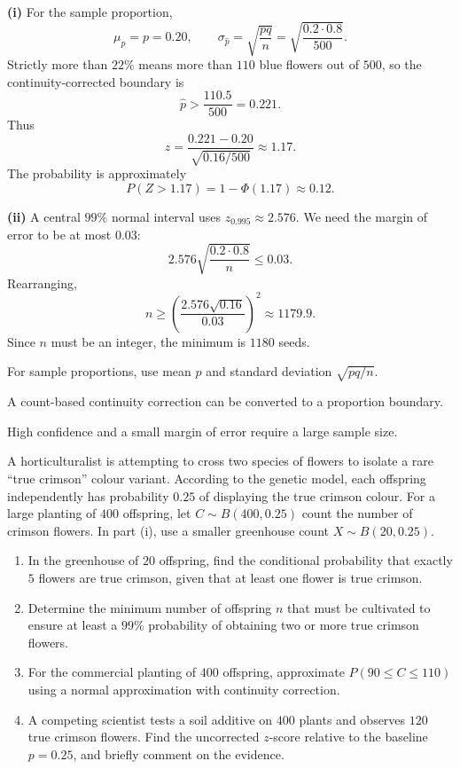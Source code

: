 \begin{solution}
\textbf{(i)} For the sample proportion,
\[
\mu_{\hat p}=p=0{.}20,\qquad
\sigma_{\hat p}=\sqrt{\frac{pq}{n}}=\sqrt{\frac{0{.}2\cdot0{.}8}{500}}.
\]
Strictly more than $22\%$ means more than $110$ blue flowers out of $500$, so the continuity-corrected boundary is
\[
\hat p>\frac{110{.}5}{500}=0{.}221.
\]
Thus
\[
z=\frac{0{.}221-0{.}20}{\sqrt{0{.}16/500}}\approx1{.}17.
\]
The probability is approximately
\[
P(Z>1{.}17)=1-\Phi(1{.}17)\approx \boxed{0{.}12}.
\]

\textbf{(ii)} A central $99\%$ normal interval uses $z_{0{.}995}\approx2{.}576$. We need the margin of error to be at most $0{.}03$:
\[
2{.}576\sqrt{\frac{0{.}2\cdot0{.}8}{n}}\le0{.}03.
\]
Rearranging,
\[
n\ge\left(\frac{2{.}576\sqrt{0{.}16}}{0{.}03}\right)^2\approx1179{.}9.
\]
Since $n$ must be an integer, the minimum is $\boxed{1180}$ seeds.
\end{solution}

\begin{takeaways}
\item For sample proportions, use mean $p$ and standard deviation $\sqrt{pq/n}$.
\item A count-based continuity correction can be converted to a proportion boundary.
\item High confidence and a small margin of error require a large sample size.
\end{takeaways}

\begin{problem}
A horticulturalist is attempting to cross two species of flowers to isolate a rare ``true crimson'' colour variant. According to the genetic model, each offspring independently has probability $0{.}25$ of displaying the true crimson colour. For a large planting of $400$ offspring, let $C\sim B(400,0{.}25)$ count the number of crimson flowers. In part (i), use a smaller greenhouse count $X\sim B(20,0{.}25)$.
\begin{enumerate}[label=\textbf{(\roman*)}]
\item In the greenhouse of $20$ offspring, find the conditional probability that exactly $5$ flowers are true crimson, given that at least one flower is true crimson.
\item Determine the minimum number of offspring $n$ that must be cultivated to ensure at least a $99\%$ probability of obtaining two or more true crimson flowers.
\item For the commercial planting of $400$ offspring, approximate $P(90\le C\le110)$ using a normal approximation with continuity correction.
\item A competing scientist tests a soil additive on $400$ plants and observes $120$ true crimson flowers. Find the uncorrected $z$-score relative to the baseline $p=0{.}25$, and briefly comment on the evidence.
\end{enumerate}


\end{problem}

